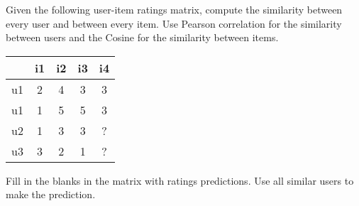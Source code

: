 \documentclass[12pt]{article}
\begin{document}
Given the following user-item ratings matrix, compute the similarity between
every user and between every item. Use Pearson correlation for the similarity
between users and the Cosine for the similarity between items.

\begin{center}
    \begin{tabular}{|c|c|c|c|c|}\hline
      & i1 & i2 & i3  & i4\\\hline  
      u1  & 2 & 4 & 3 & 3 \\\hline  
      u1  & 1 & 5 & 5 & 3 \\\hline  
      u2  & 1 & 3 & 3 & ? \\\hline  
      u3  & 3 & 2 & 1 & ? \\\hline  
    \end{tabular}
\end{center}

Fill in the blanks in the matrix with ratings predictions. Use all similar
users to make the prediction.
\end{document}
